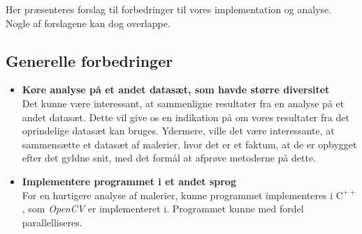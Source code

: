 {
{\sffamily Her præsenteres forslag til forbedringer til vores
implementation og analyse. Nogle af forslagene kan dog overlappe.
}

\subsection{Generelle forbedringer}
\begin{itemize}
    \item \textbf{Køre analyse på et andet datasæt, som havde større diversitet}\\
        Det kunne være interessant, at sammenligne resultater fra en
        analyse på et andet datasæt. Dette vil give os en indikation på
        om vores resultater fra det oprindelige datasæt kan bruges.
        Ydermere, ville det være interessante, at sammensætte et datasæt
        af malerier, hvor det er et faktum, at de er opbygget efter det
        gyldne snit, med det formål at afprøve metoderne på dette.
    \item \textbf{Implementere programmet i et andet sprog}\\
        For en hurtigere analyse af malerier, kunne programmet
        implementeres i $\textrm{C}^{++}$, som \emph{OpenCV} er
        implementeret i. Programmet kunne med fordel parallelliseres.
\end{itemize}

}
